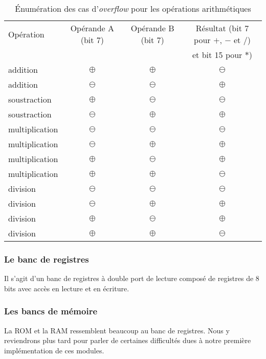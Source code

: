 \begin{table}[h!]
  \centering
  \begin{tabular}{| l | c | c | c |}
    \hline
    Opération & Opérande A (bit 7) & Opérande B (bit 7) & Résultat (bit 7 pour $+$, $-$ et $/$) \\
    & & & et bit 15 pour $*$) \\ \hline
    addition & $\oplus$ & $\oplus$ & $\ominus$ \\ \hline
    addition & $\ominus$ & $\ominus$ & $\oplus$ \\ \hline
    soustraction & $\oplus$ & $\ominus$ & $\ominus$ \\ \hline
    soustraction & $\ominus$ & $\oplus$ & $\oplus$ \\ \hline
    multiplication & $\ominus$ & $\ominus$ & $\ominus$ \\ \hline
    multiplication & $\ominus$ & $\oplus$ & $\oplus$ \\ \hline
    multiplication & $\oplus$ & $\ominus$ & $\oplus$ \\ \hline
    multiplication & $\oplus$ & $\oplus$ & $\ominus$ \\ \hline
    division & $\ominus$ & $\ominus$ & $\ominus$ \\ \hline
    division & $\ominus$ & $\oplus$ & $\oplus$ \\ \hline
    division & $\oplus$ & $\ominus$ & $\oplus$ \\ \hline
    division & $\oplus$ & $\oplus$ & $\ominus$ \\ \hline
  \end{tabular}
  \caption{Énumération des cas d'\textit{overflow} pour les opérations arithmétiques}
  \label{tab:overflow-cases}
\end{table}

\subsubsection*{Le banc de registres}

Il s'agit d'un banc de registres à double port de lecture composé de registres de 8 bits avec accès en lecture et en écriture.

\subsubsection*{Les bancs de mémoire}

La ROM et la RAM ressemblent beaucoup au banc de registres. Nous y reviendrons plus tard pour parler de certaines difficultés dues à notre première implémentation de ces modules.

